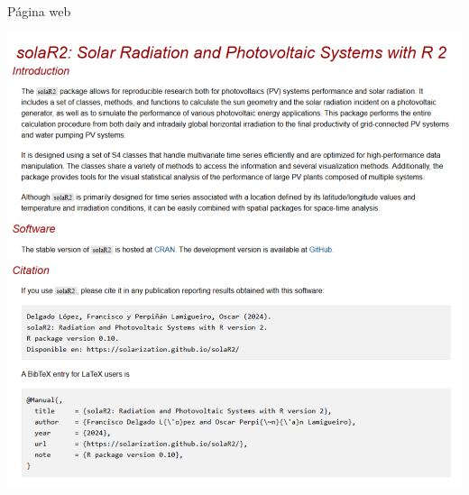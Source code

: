 \documentclass[aspectratio=169, usenames,svgnames,dvipsnames]{beamer}
\begin{document}
\begin{frame}[label={sec:org2bce9bb}]{Página web}
\begin{center}
\href{https://solarization.github.io/solaR2/}{\includegraphics[height=0.9\textheight]{../figuras/github.io.png}}
\end{center}
\end{frame}
\end{document}
